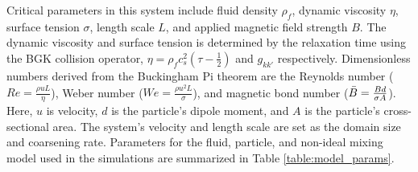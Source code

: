 

Critical parameters in this system include fluid density $\rho_f$, dynamic viscosity $\eta$, surface tension $\sigma$, 
length scale $L$, and applied magnetic field strength $B$. The dynamic viscosity and surface tension is determined 
by the relaxation time using the BGK collision operator, $\eta = \rho_f c_s^2(\tau - \frac{1}{2})$ and $g_{kk'}$ 
respectively. Dimensionless numbers derived from the Buckingham Pi theorem are the Reynolds number
($Re = \frac{\rho u L}{\eta}$), Weber number ($We = \frac{\rho u^2 L}{\sigma}$), and magnetic bond number 
($\Bar{B} = \frac{Bd}{\sigma A}$). Here, $u$ is velocity, $d$ is the particle's dipole moment, and $A$ is the 
particle's cross-sectional area. The system's velocity and length scale are set as the domain size and coarsening rate. 
Parameters for the fluid, particle, and non-ideal mixing model used in the simulations are summarized in Table 
\ref{table:model_params}.

